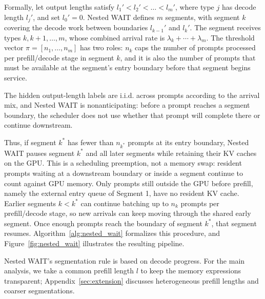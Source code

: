 Formally, let output lengths satisfy $l_1' < l_2' < \dots < l_m'$, where type $j$ has decode length $l_j'$, and set $l_0'=0$. Nested WAIT defines \(m\) segments, with segment \(k\) covering the decode work between boundaries \(l_{k-1}'\) and \(l_k'\). The segment receives types \(k,k+1,\dots,m\), whose combined arrival rate is \(\lambda_k+\cdots+\lambda_m\). The threshold vector \(\pi=[n_1,\dots,n_m]\) has two roles: \(n_k\) caps the number of prompts processed per prefill/decode stage in segment \(k\), and it is also the number of prompts that must be available at the segment's entry boundary before that segment begins service.

The hidden output-length labels are i.i.d. across prompts according to the arrival mix, and Nested WAIT is nonanticipating: before a prompt reaches a segment boundary, the scheduler does not use whether that prompt will complete there or continue downstream.

Thus, if segment \(k^*\) has fewer than \(n_{k^*}\) prompts at its entry boundary, Nested WAIT pauses segment \(k^*\) and all later segments while retaining their KV caches on the GPU. This is a scheduling preemption, not a memory swap: resident prompts waiting at a downstream boundary or inside a segment continue to count against GPU memory. Only prompts still outside the GPU before prefill, namely the external entry queue of Segment 1, have no resident KV cache. Earlier segments \(k<k^*\) can continue batching up to \(n_k\) prompts per prefill/decode stage, so new arrivals can keep moving through the shared early segment. Once enough prompts reach the boundary of segment \(k^*\), that segment resumes. Algorithm~\ref{alg:nested_wait} formalizes this procedure, and Figure~\ref{fig:nested_wait} illustrates the resulting pipeline.

Nested WAIT's segmentation rule is based on decode progress. For the main analysis, we take a common prefill length \(l\) to keep the memory expressions transparent; Appendix~\ref{sec:extension} discusses heterogeneous prefill lengths and coarser segmentations.

